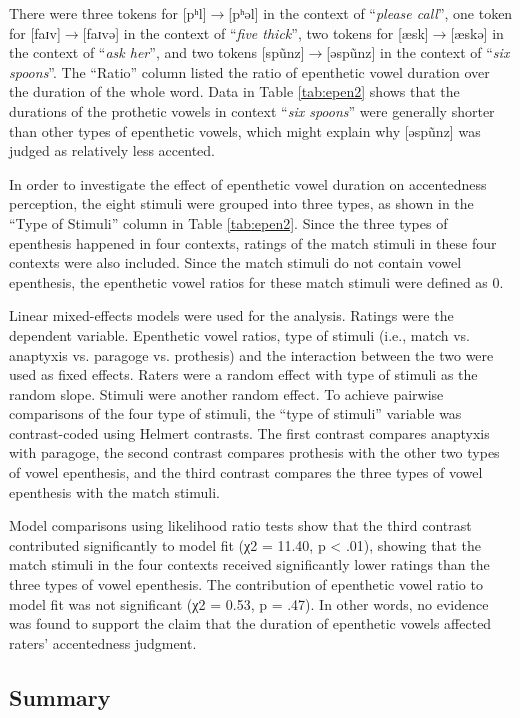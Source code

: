 There were three tokens for [pʰl]$\rightarrow$[pʰəl] in the context of “\textit{please call}”, one token for [faɪv]$\rightarrow$[faɪvə] in the context of “\textit{five thick}”, two tokens for [æsk]$\rightarrow$[æskə] in the context of “\textit{ask her}”, and two tokens [spũnz]$\rightarrow$[əspũnz] in the context of “\textit{six spoons}”. The “Ratio” column listed the ratio of epenthetic vowel duration over the duration of the whole word. Data in Table \ref{tab:epen2} shows that the durations of the prothetic vowels in context “\textit{six spoons}” were generally shorter than other types of epenthetic vowels, which might explain why [əspũnz] was judged as relatively less accented. 

In order to investigate the effect of epenthetic vowel duration on accentedness perception, the eight stimuli were grouped into three types, as shown in the “Type of Stimuli” column in Table \ref{tab:epen2}. Since the three types of epenthesis happened in four contexts, ratings of the match stimuli in these four contexts were also included. Since the match stimuli do not contain vowel epenthesis, the epenthetic vowel ratios for these match stimuli were defined as 0. 

Linear mixed-effects models were used for the analysis. Ratings were the dependent variable. Epenthetic vowel ratios, type of stimuli (i.e., match vs. anaptyxis vs. paragoge vs. prothesis) and the interaction between the two were used as fixed effects. Raters were a random effect with type of stimuli as the random slope. Stimuli were another random effect. To achieve pairwise comparisons of the four type of stimuli, the “type of stimuli” variable was contrast-coded using Helmert contrasts. The first contrast compares anaptyxis with paragoge, the second contrast compares prothesis with the other two types of vowel epenthesis, and the third contrast compares the three types of vowel epenthesis with the match stimuli.

Model comparisons using likelihood ratio tests show that the third contrast contributed significantly to model fit  (χ2 = 11.40, p < .01), showing that the match stimuli in the four contexts received significantly lower ratings than the three types of vowel epenthesis. The contribution of epenthetic vowel ratio to model fit was not significant (χ2 = 0.53, p = .47). In other words, no evidence was found to support the claim that the duration of epenthetic vowels affected raters' accentedness judgment.

\subsection{Summary}

